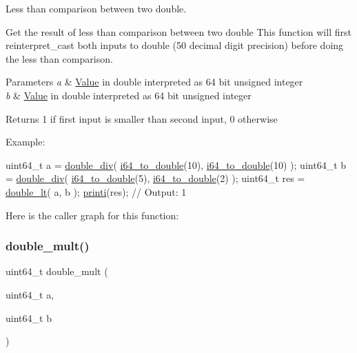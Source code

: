 Less than comparison between two double. 

Get the result of less than comparison between two double This function will first reinterpret\+\_\+cast both inputs to double (50 decimal digit precision) before doing the less than comparison. 
\begin{DoxyParams}{Parameters}
{\em a} & \mbox{\hyperlink{struct_value}{Value}} in double interpreted as 64 bit unsigned integer \\
\hline
{\em b} & \mbox{\hyperlink{struct_value}{Value}} in double interpreted as 64 bit unsigned integer \\
\hline
\end{DoxyParams}
\begin{DoxyReturn}{Returns}
1 if first input is smaller than second input, 0 otherwise
\end{DoxyReturn}
Example\+: 
\begin{DoxyCode}
uint64\_t a = \mbox{\hyperlink{group__mathcapi_gad67af06a6b0e9dbbf3be05d6bf99257c}{double\_div}}( \mbox{\hyperlink{group__mathcapi_gaec506d4ee77526e67ab5f2a8ef54f2b5}{i64\_to\_double}}(10), \mbox{\hyperlink{group__mathcapi_gaec506d4ee77526e67ab5f2a8ef54f2b5}{i64\_to\_double}}(10) );
uint64\_t b = \mbox{\hyperlink{group__mathcapi_gad67af06a6b0e9dbbf3be05d6bf99257c}{double\_div}}( \mbox{\hyperlink{group__mathcapi_gaec506d4ee77526e67ab5f2a8ef54f2b5}{i64\_to\_double}}(5), \mbox{\hyperlink{group__mathcapi_gaec506d4ee77526e67ab5f2a8ef54f2b5}{i64\_to\_double}}(2) );
uint64\_t res = \mbox{\hyperlink{group__mathcapi_ga68d359e670da751723bf3d78ff759614}{double\_lt}}( a, b );
\mbox{\hyperlink{group__consolecapi_gaac924af668edbf421d478edf203fdbd1}{printi}}(res); \textcolor{comment}{// Output: 1}
\end{DoxyCode}
 Here is the caller graph for this function\+:
\mbox{\label{group__mathcapi_ga6390d36d23bd89bcd9bcf52385ba88f2}} 
\subsubsection{\texorpdfstring{double\+\_\+mult()}{double\_mult()}}
{\footnotesize\ttfamily uint64\+\_\+t double\+\_\+mult (\begin{DoxyParamCaption}\item[{uint64\+\_\+t}]{a,  }\item[{uint64\+\_\+t}]{b }\end{DoxyParamCaption})}



